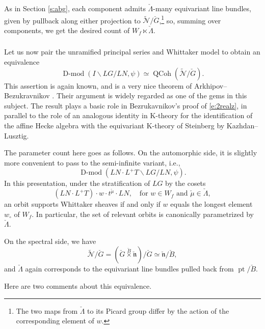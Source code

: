 \documentclass[10pt]{amsart}
\newcommand{\pt}{\on{pt}}
\newcommand{\cB}{\check{B}}
\newcommand{\on}{\operatorname}
\newcommand{\Dmod}{\on{D-mod}}
\theoremstyle{remark}
\newcommand{\sN}{\mathscr{N}}
\newcommand{\fn}{\mathfrak{n}}
\numberwithin{equation}{section}
\newcommand{\cG}{\check{G}}
\newcommand{\QCoh}{\on{QCoh}}
\begin{document}
As in Section \ref{s:abg}, each component admits 
$\check{\Lambda}$-many equivariant line bundles, given by pullback along either 
projection to $\widetilde{\sN}/\cG$,\footnote{The two maps from 
$\check{\Lambda}$ to its Picard group differ by the action of the corresponding 
element of $w$.} so, summing over components, we get the desired count of $W_f 
\ltimes \check{\Lambda}.$ 



\subsubsection{}Let us now pair the unramified principal series and Whittaker 
model to obtain an equivalence
%
\begin{equation} \label{e:arkbez}
    \Dmod( I \backslash LG / LN, \psi) \simeq \QCoh( \widetilde{\sN} / \cG).
\end{equation}
%
This assertion is again known, and is a very nice theorem of  Arkhipov--Bezukravnikov \cite{ab}. Their argument is widely regarded as one of the gems in this subject. The result plays a basic role in Bezrukavnikov's proof of \eqref{e:2realz}, in parallel to the role of an analogous identity in K-theory for the 
identification of the affine Hecke algebra with the equivariant K-theory of 
Steinberg by Kazhdan--Lusztig.  

The parameter count here goes as follows. 
On the automorphic side, it is slightly more convenient to pass to the 
semi-infinite variant, i.e., 
\begin{equation} \label{e:semiinfre}  \Dmod( LN \cdot L^+T \backslash LG / LN, 
\psi).\end{equation}
In this presentation, under the stratification of $LG$ by the cosets
\[ (LN \cdot L^+T) \cdot w \cdot t^{\check{\mu}} \cdot LN,   \quad \text{for } 
w 
\in W_f \text{ and }  \check{\mu} \in \check{\Lambda}, \]
an orbit supports Whittaker sheaves if and only if $w$ equals the longest 
element $w_\circ$ of $W_f$. In particular, the set of relevant orbits is 
canonically parametrized by $\check{\Lambda}$. 

On the spectral side, we have
%
\[
    \widetilde{\sN} / \cG = (\cG \overset \cB \times \check{\fn}) / \cG \simeq 
    \check{\fn} / \cB,  
\]
%
and $\check{\Lambda}$ again corresponds to the equivariant line bundles 
pulled back from $\pt / \cB$. 

Here are two comments about this equivalence. 
\end{document}
